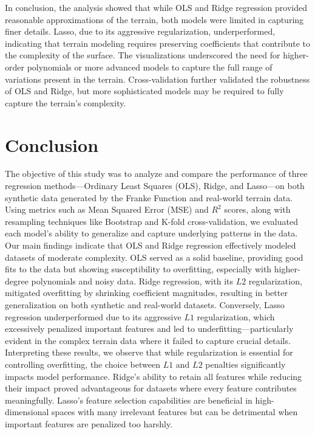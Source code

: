 \documentclass{article}
\begin{document}
\begin{enumerate}
In conclusion, the analysis showed that while OLS and Ridge regression provided reasonable approximations of the terrain, both models were limited in capturing finer details. Lasso, due to its aggressive regularization, underperformed, indicating that terrain modeling requires preserving coefficients that contribute to the complexity of the surface. The visualizations underscored the need for higher-order polynomials or more advanced models to capture the full range of variations present in the terrain. Cross-validation further validated the robustness of OLS and Ridge, but more sophisticated models may be required to fully capture the terrain’s complexity.

\section{Conclusion}

The objective of this study was to analyze and compare the performance of three regression methods—Ordinary Least Squares (OLS), Ridge, and Lasso—on both synthetic data generated by the Franke Function and real-world terrain data. Using metrics such as Mean Squared Error (MSE) and \( R^2 \) scores, along with resampling techniques like Bootstrap and K-fold cross-validation, we evaluated each model's ability to generalize and capture underlying patterns in the data.\\

Our main findings indicate that OLS and Ridge regression effectively modeled datasets of moderate complexity. OLS served as a solid baseline, providing good fits to the data but showing susceptibility to overfitting, especially with higher-degree polynomials and noisy data. Ridge regression, with its \( L2 \) regularization, mitigated overfitting by shrinking coefficient magnitudes, resulting in better generalization on both synthetic and real-world datasets. Conversely, Lasso regression underperformed due to its aggressive \( L1 \) regularization, which excessively penalized important features and led to underfitting—particularly evident in the complex terrain data where it failed to capture crucial details.\\

Interpreting these results, we observe that while regularization is essential for controlling overfitting, the choice between \( L1 \) and \( L2 \) penalties significantly impacts model performance. Ridge's ability to retain all features while reducing their impact proved advantageous for datasets where every feature contributes meaningfully. Lasso's feature selection capabilities are beneficial in high-dimensional spaces with many irrelevant features but can be detrimental when important features are penalized too harshly.\\


\end{enumerate}
\end{document}
